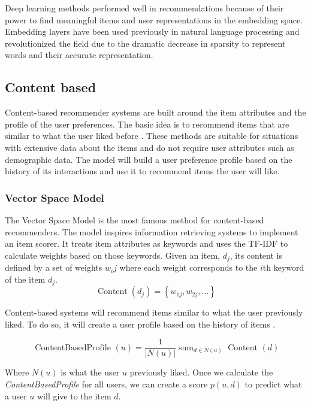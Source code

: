 \documentclass{kththesis}
\begin{document}
Deep learning methods performed well in recommendations because of their power to find meaningful items and user representations in the embedding space. Embedding layers have been used previously in natural language processing and revolutionized the field due to the dramatic decrease in sparsity to represent words and their accurate representation. 

\subsection{Content based}
Content-based recommender systems are built around the item attributes and the profile of the user preferences. The basic idea is to recommend items that are similar to what the user liked before \cite{contentbased}. These methods are suitable for situations with extensive data about the items and do not require user attributes such as demographic data. The model will build a user preference profile based on the history of its interactions and use it to recommend items the user will like.

\subsubsection{Vector Space Model}
The Vector Space Model\cite{vectorspacemodel} is the most famous method for content-based recommenders. The model inspires information retrieving systems to implement an item scorer. It treats item attributes as keywords and uses the TF-IDF\cite{tfidf} to calculate weights based on those keywords. Given an item, $d_j$, its content is defined by a set of weights $w_ij$ where each weight corresponds to the $i$th keyword of the item $d_j$.
\begin{equation}
\operatorname{Content}\left(d_{j}\right)=\left\{w_{1 j}, w_{2 j}, \ldots\right\}
\end{equation}

Content-based systems will recommend items similar to what the user previously liked. To do so, it will create a user profile based on the history of items \cite{contentprofile}.

\begin{equation}
\text { ContentBasedProfile }(u)=\frac{1}{|N(u)|} \operatorname{sum}_{d \in N(u)} \text { Content }(d)
\end{equation}

Where $N(u)$ is what the user $u$ previously liked. Once we calculate the \textit{ContentBasedProfile} for all users, we can create a score $p(u,d)$ to predict what a user $u$ will give to the item $d$.
\end{document}
